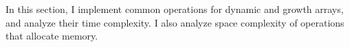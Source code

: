 In this section, I implement common operations for dynamic and growth arrays, and analyze their time complexity. I also analyze space complexity of operations that allocate memory.